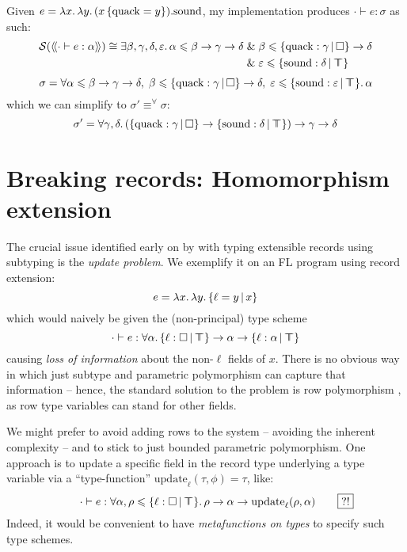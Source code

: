\begin{example}
    Given
    $e = \lambda {x} \ldotp \lambda {y} \ldotp {(x \, \{ \mathrm{quack} = y \})}{.}{\mathrm{sound}}$,
    my implementation produces $\cdot \vdash e : \sigma$ as such:
    \begin{align*}
    \mathcal S(\cstr{\cdot}{e}{\alpha}) \cong \exists \beta, \gamma, \delta, \varepsilon \ldotp \alpha \sub \beta \to \gamma \to \delta \und& \beta \sub \flext{\mathrm{quack}: \gamma}{\flabsent} \to \delta \\ \und& \varepsilon \sub \flext{\mathrm{sound}: \delta}{\flftop}     
    \end{align*}    
    $$ \sigma = \forall \alpha \sub \beta \to \gamma \to \delta,\; \beta \sub \flext{\mathrm{quack}: \gamma}{\flabsent} \to \delta,\; \varepsilon \sub \flext{\mathrm{sound}: \varepsilon}{\flftop} \ldotp \alpha $$
    which we can simplify to $\sigma' \equiv^\forall \sigma$:
    $$ \sigma' = \forall \gamma, \delta \ldotp (\flext{\mathrm{quack}: \gamma}{\flabsent} \to \flext{\mathrm{sound} : \delta}{\flftop}) \to \gamma \to \delta $$
\end{example}

\section{Breaking records: Homomorphism extension}
\label{sec:morphisms}

The crucial issue identified early on by \textcite{operations-on-records} with typing extensible records using subtyping is the \emph{update problem}. We exemplify it on an FL program using record extension:
$$ e = \fllam x \fllam y \flext{\ell = y}{x} $$
which would naively be given the (non-principal) type scheme
$$ \cdot \vdash e : \forall \alpha \ldotp \flext{\ell : \flabsent}{\flftop} \to \alpha \to \flext{\ell : \alpha}{\flftop} $$
causing \emph{loss of information} about the non-$\ell$ fields of $x$. There is no obvious way in which just subtype and parametric polymorphism can capture that information -- hence, the standard solution to the problem is row polymorphism \cite{remy-records}, as row type variables can stand for other fields. 

We might prefer to avoid adding rows to the system -- avoiding the inherent complexity -- and to stick to just bounded parametric polymorphism. One approach is to update a specific field in the record type underlying a type variable \cite{operations-on-records} via a \enquote{type-function} $\mathrm{update}_\ell(\tau, \phi) = \tau$, like:
$$ \qquad \cdot \vdash e : \forall \alpha, \rho \sub \flext{\ell : \flabsent}{\flftop} \ldotp \rho \to \alpha \to \mathrm{update}_\ell(\rho, \alpha) \qquad \boxed{?!} $$
Indeed, it would be convenient to have \emph{metafunctions on types} to specify such type schemes.

